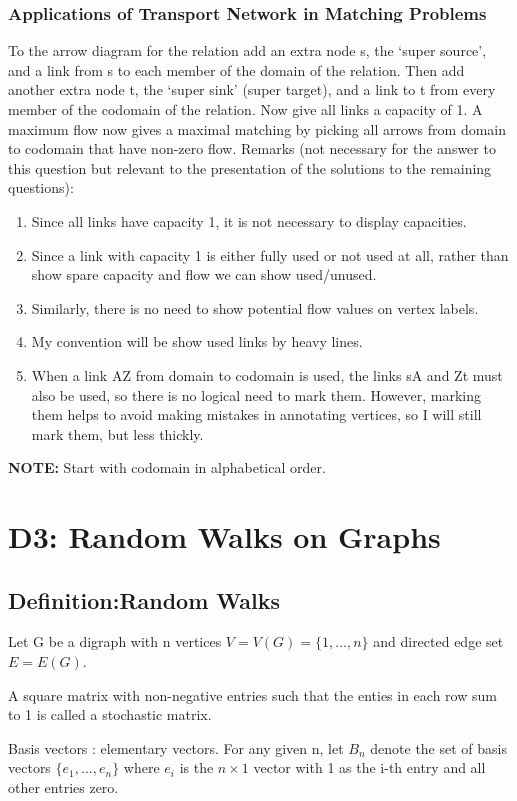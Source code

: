 \documentclass{article}
\begin{document}
\begin{spacing}{1.5}
\subsubsection{Applications of Transport Network in Matching Problems }
To the arrow diagram for the relation add an extra node s, the ‘super source’, and a link from s to each member of the domain of the relation. Then add another extra node t, the ‘super sink’ (super target), and a link to t from every member of the codomain of the relation. Now give all links a capacity of 1. A maximum flow now gives a maximal matching by picking all arrows from domain to codomain that have non-zero flow.
Remarks (not necessary for the answer to this question but relevant to the presentation of the solutions to the remaining questions):
\begin{enumerate}
    \item Since all links have capacity 1, it is not necessary to display capacities.
    \item Since a link with capacity 1 is either fully used or not used at all, rather than show
    spare capacity and flow we can show used/unused.
    \item Similarly, there is no need to show potential flow values on vertex labels.
    \item My convention will be show used links by heavy lines.
    \item When a link AZ from domain to codomain is used, the links sA and Zt must also be used, so there is no logical need to mark them. However, marking them helps to avoid making mistakes in annotating vertices, so I will still mark them, but less thickly.
\end{enumerate}
\textbf{NOTE:}
Start with codomain in alphabetical order. 

\section{D3: Random Walks on Graphs}
\subsection{Definition:Random Walks}
Let G be a digraph with n vertices $V = V(G) = \{1,\dots,n\}$ and directed edge set $E = E(G)$. 

A square matrix with non-negative entries such that the enties in each row sum to 1 is called a stochastic matrix. 

Basis vectors : elementary vectors. For any given n, let $B_n$ denote the set of basis vectors $\{e_1,\dots,e_n\}$ where $e_i$ is the $n \times 1 $ vector with 1 as the i-th entry and all other entries zero. 


\end{spacing}
\end{document}
